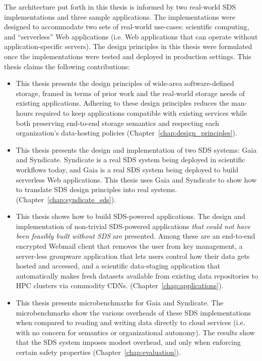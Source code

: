 The architecture put forth in this thesis is informed by two real-world SDS
implementations and three sample applications.  The implementations were 
designed to accommodate two sets of real-world use-cases: scientific computing,
and ``serverless'' Web applications (i.e. Web applications that can operate
without application-specific servers).
The design principles in this thesis 
were formulated once the implementations were tested and
deployed in production settings.  This thesis claims the following contributions:

\begin{itemize}

\item This thesis presents the design principles of wide-area software-defined storage, framed in
terms of prior work and the real-world storage needs of existing applications.
Adhering to these design principles reduces the man-hours required to keep applications compatible
with existing services while both preserving end-to-end storage semantics and
respecting each organization's data-hosting policies (Chapter~\ref{chap:design_principles}).

\item This thesis presents the design and implementation of two SDS systems: Gaia and
Syndicate.  Syndicate is a real SDS system being deployed in scientific
workflows today, and Gaia is a real SDS system being deployed to build
serverless Web applications.
This thesis uses Gaia and Syndicate to show how to translate SDS design
principles into real systems.
(Chapter~\ref{chap:syndicate_sds}).

\item This thesis shows how to build SDS-powered applications.  The design and
implementation of non-trivial SDS-powered applications \emph{that could not
have been feasibly built without SDS} are presented.  Among these are an end-to-end encrypted
Webmail client that removes the user from key management, a server-less
groupware application that lets users control how their data gets hosted and
accessed, and a scientific data-staging application that
automatically makes fresh datasets available from existing data repositories to
HPC clusters via commodity CDNs.
(Chapter~\ref{chap:applications}).

\item This thesis presents microbenchmarks for Gaia and Syndicate.  The
microbenchmarks show the various overheads of these SDS implementations when
compared to reading and writing data directly to cloud services (i.e. with no
concern for semantics or organizational autonomy).  The results show that the SDS
system imposes modest overhead, and only when enforcing certain safety
properties (Chapter~\ref{chap:evaluation}).

\end{itemize}

